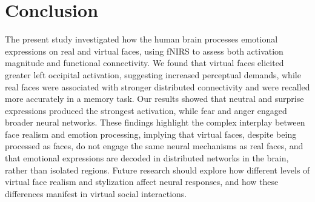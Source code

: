 \section{Conclusion}
The present study investigated how the human brain processes emotional expressions on real and virtual faces, using fNIRS to assess both activation magnitude and functional connectivity. 
We found that virtual faces elicited greater left occipital activation, suggesting increased perceptual demands, while real faces were associated with stronger distributed connectivity and were recalled more accurately in a memory task.
Our results showed that neutral and surprise expressions produced the strongest activation, while fear and anger engaged broader neural networks. 
These findings highlight the complex interplay between face realism and emotion processing, implying that virtual faces, despite being processed as faces, do not engage the same neural mechanisms as real faces, and that emotional expressions are decoded in distributed networks in the brain, rather than isolated regions.
Future research should explore how different levels of virtual face realism and stylization affect neural responses, and how these differences manifest in virtual social interactions.